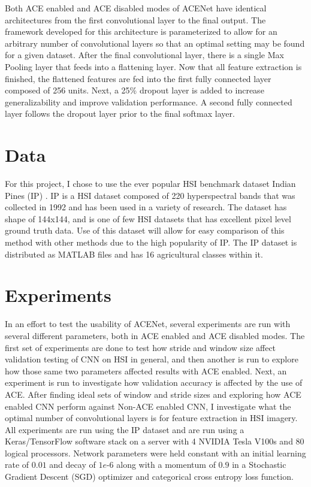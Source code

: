 \documentclass[12pt]{article}
\begin{document}
Both ACE enabled and ACE disabled modes of ACENet have identical architectures from the first convolutional layer to the final output.
%
The framework developed for this architecture is parameterized to allow for an arbitrary number of convolutional layers so that an optimal setting may be found for a given dataset.
%
After the final convolutional layer, there is a single Max Pooling layer that feeds into a flattening layer.
%
Now that all feature extraction is finished, the flattened features are fed into the first fully connected layer composed of 256 units.
%
Next, a 25\% dropout layer is added to increase generalizability and improve validation performance.
%
A second fully connected layer follows the dropout layer prior to the final softmax layer.



%
\section{Data}\label{sec:data}
For this project, I chose to use the ever popular HSI benchmark dataset Indian Pines (IP) \cite{IP}.
%
IP is a HSI dataset composed of 220 hyperspectral bands that was collected in 1992 and has been used in a variety of research.
%
The dataset has shape of 144x144, and is one of few HSI datasets that has excellent pixel level ground truth data.
%
Use of this dataset will allow for easy comparison of this method with other methods due to the high popularity of IP.
%
The IP dataset is distributed as MATLAB files and has 16 agricultural classes within it.

%
\section{Experiments}\label{sec:experiments}

In an effort to test the usability of ACENet, several experiments are run with several different parameters, both in ACE enabled and ACE disabled modes. 
%
The first set of experiments are done to test how stride and window size affect validation testing of CNN on HSI in general, and then another is run to explore how those same two parameters affected results with ACE enabled.
%
Next, an experiment is run to investigate how validation accuracy is affected by the use of ACE.
%
After finding ideal sets of window and stride sizes and exploring how ACE enabled CNN perform against Non-ACE enabled CNN, I investigate what the optimal number of convolutional layers is for feature extraction in HSI imagery.
%
All experiments are run using the IP dataset and are run using a Keras/TensorFlow software stack on a server with 4 NVIDIA Tesla V100s and 80 logical processors.
%
Network parameters were held constant with an initial learning rate of $0.01$ and decay of $1e\text{-}6$ along with a momentum of $0.9$ in a Stochastic Gradient Descent (SGD) optimizer and categorical cross entropy loss function.
% 
\end{document}
